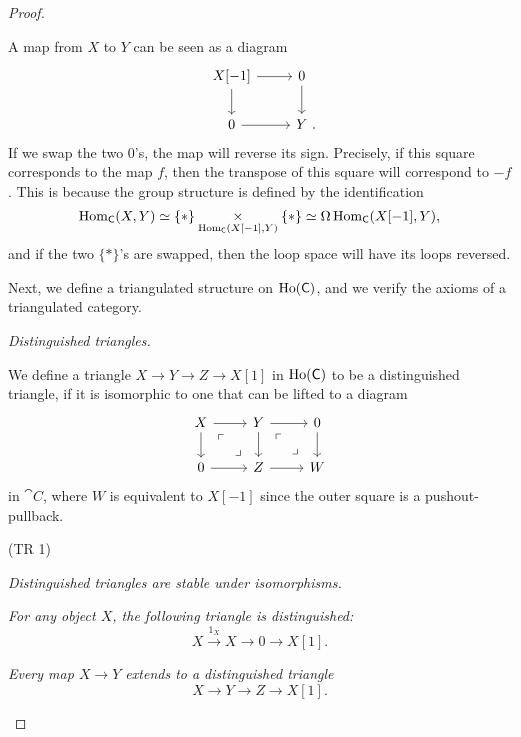 \begin{proof}
\begin{itms}
        A map from $X$ to $Y$ can be seen as a diagram
        \[\begin{tikzcd}
            X[-1]\ar[r]\ar[d] & 0\ar[d] \\
            0\ar[r] & Y\rlap{\ .}
        \end{tikzcd}\]
        If we swap the two $0$'s, the map will reverse its sign.
        Precisely, if this square corresponds to the map $f$,
        then the transpose of this square will correspond to $-f$.
        This is because the group structure is defined by the identification
        \[\operatorname{Hom}_{\mathsf{C}}(X,Y)\simeq\{*\}\underset{\operatorname{Hom}_{\mathsf{C}}(X[-1],Y)}{\times}\{*\}
        \simeq\Omega\operatorname{Hom}_{\mathsf{C}}(X[-1],Y),\]
        and if the two $\{*\}$'s are swapped,
        then the loop space will have its loops reversed.
    \end{itms}

    Next, we define a triangulated structure on $\operatorname{Ho}(\mathsf{C})$,
    and we verify the axioms of a triangulated category.

    \begin{itms}
        \item \emph{Distinguished triangles.}
        
        We define a triangle $X\to Y\to Z\to X[1]$ in $\operatorname{Ho}(\mathsf{C})$
        to be a distinguished triangle,
        if it is isomorphic to one that can be lifted to a diagram 
        \[\begin{tikzcd}
            X\ar[r]\ar[d]\ar[dr,phantom,"\ulcorner" pos=.25,"\lrcorner" pos=.75] &
            Y\ar[r]\ar[d]\ar[dr,phantom,"\ulcorner" pos=.25,"\lrcorner" pos=.75] & 0\ar[d] \\
            0\ar[r] & Z\ar[r] & W
        \end{tikzcd}\]
        in $\cat{C}$, where $W$ is equivalent to $X[-1]$
        since the outer square is a pushout-pullback.

        \item (TR 1)
        \begin{itms}
            \item \emph{Distinguished triangles are stable under isomorphisms.}
            \item \emph{For any object $X$, the following triangle is distinguished:
            \[X\xrightarrow{1_X}X\to0\to X[1].\]}
            \item \emph{Every map $X\to Y$ extends to a distinguished triangle \[X\to Y\to Z\to X[1].\]}
        \end{itms}


\end{itms}
\end{proof}
